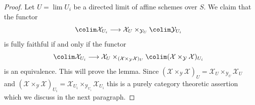 \begin{proof}
Let $U = \lim U_i$ be a directed limit of affine schemes over $S$.
We claim that the functor
$$
\colim \mathcal{X}_{U_i} \longrightarrow
\mathcal{X}_U \times_{\mathcal{Y}_U} \colim \mathcal{Y}_{U_i}
$$
is fully faithful if and only if the functor
$$
\colim \mathcal{X}_{U_i} \longrightarrow
\mathcal{X}_U \times_{(\mathcal{X} \times_\mathcal{Y} \mathcal{X})_U}
\colim (\mathcal{X} \times_\mathcal{Y} \mathcal{X})_{U_i}
$$
is an equivalence. This will prove the lemma.
Since
$(\mathcal{X} \times_\mathcal{Y} \mathcal{X})_U =
\mathcal{X}_U \times_{\mathcal{Y}_U} \mathcal{X}_U$
and
$(\mathcal{X} \times_\mathcal{Y} \mathcal{X})_{U_i} =
\mathcal{X}_{U_i} \times_{\mathcal{Y}_{U_i}} \mathcal{X}_{U_i}$
this is a purely category theoretic assertion which we discuss
in the next paragraph.


\end{proof}
